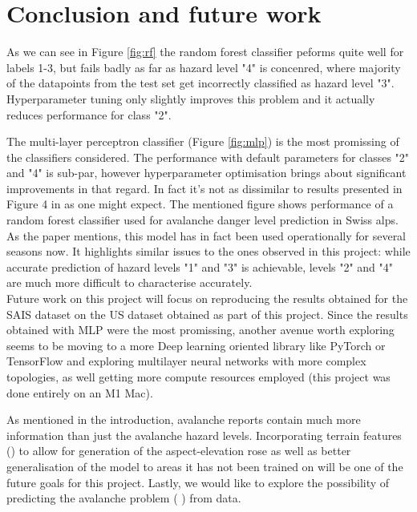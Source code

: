 \documentclass{article}
\begin{document}
\section{Conclusion and future work}
	As we can see in Figure \ref{fig:rf} the random forest classifier peforms quite well for labels 1-3, but fails badly as far as hazard level "4" is concenred, where majority of the datapoints from the test set get incorrectly classified as hazard level "3". Hyperparameter tuning only slightly improves this problem and it actually reduces performance for class "2".

	The multi-layer perceptron classifier (Figure \ref{fig:mlp}) is the most promissing of the classifiers considered. The performance with default parameters for classes "2" and "4" is sub-par, however hyperparameter optimisation brings about significant improvements in that regard.
	In fact it's not as dissimilar to results presented in Figure 4 in \cite{egusphere-2024-2374} as one might expect. The mentioned figure shows performance of a random forest classifier used for avalanche danger level prediction in Swiss alps. As the paper mentions, this model has in fact been used operationally for several seasons now. It highlights similar issues to the ones observed in this project: while accurate prediction of hazard levels "1" and "3" is achievable, levels "2" and "4" are much more difficult to characterise accurately. \\

	Future work on this project will focus on reproducing the results obtained for the SAIS dataset on the US dataset obtained as part of this project. Since the results obtained with MLP were the most promissing, another avenue worth exploring seems to be moving to a more Deep learning oriented library like PyTorch or TensorFlow and exploring multilayer neural networks with more complex topologies, as well getting more compute resources employed (this project was done entirely on an M1 Mac).

	As mentioned in the introduction, avalanche reports contain much more information than just the avalanche hazard levels. Incorporating terrain features (\cite{egusphere-2023-2948}) to allow for generation of the aspect-elevation rose as well as better generalisation of the model to areas it has not been trained on will be one of the future goals for this project. Lastly, we would like to explore the possibility of predicting the avalanche problem (\cite{MORIN2020102910} \cite{REUTER2022103462}) from data.
\end{document}
